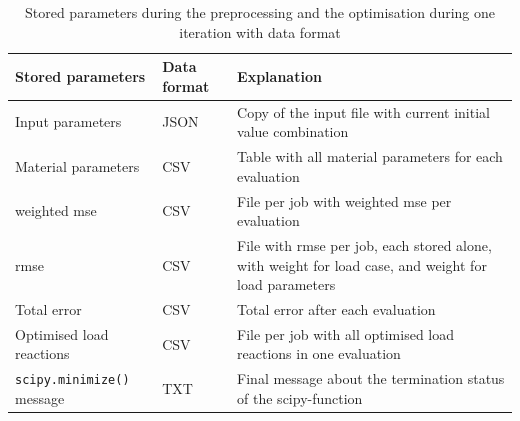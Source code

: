 \begin{table}[H]
    \centering
    \renewcommand{\arraystretch}{1.2}
    \caption{Stored parameters during the preprocessing and the optimisation during one iteration with data format}
    \label{tab:storageData}
    \begin{tabular}{L{0.3\textwidth}|C{0.1\textwidth}L{0.5\textwidth}}
    \toprule
   \textbf{Stored parameters} & \textbf{Data format} & \textbf{Explanation}\\ \midrule
   Input parameters & JSON & Copy of the input file with current initial value combination\\ \hline
   Material parameters & CSV & Table with all material parameters for each evaluation\\\hline
   weighted \acrshort{mse} & CSV & File per job with weighted \acrshort{mse} per evaluation \\\hline
   \acrshort{rmse} & CSV & File with \acrshort{rmse} per job, each stored alone, with weight for load case, and weight for load parameters \\\hline
   Total error & CSV & Total error after each evaluation \\\hline
   Optimised load reactions & CSV & File per job with all optimised load reactions in one evaluation \\\hline
   \verb|scipy.minimize()| message & TXT & Final message about the termination status of the scipy-function\\
    \bottomrule
    \end{tabular}
    
\end{table}





